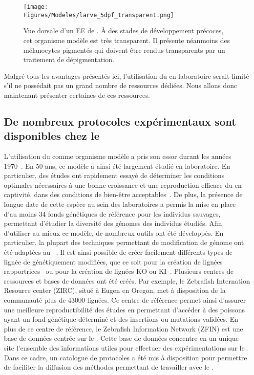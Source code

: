\documentclass[\main/main.tex]{subfiles}
\begin{document}
\begin{figure}[h!]
    \centering
    \texttt{[image: \\Figures/Modeles/larve\_5dpf\_transparent.png]}
    \caption{Vue dorsale d'un EE de \pz{}.\newline
    À des stades de développement précoces, cet organisme modèle est très transparent.
    Il présente néanmoins des mélanocytes pigmentés qui doivent être rendus transparents par un traitement de dépigmentation.
    }
    \label{fig:zebra:transparent}
\end{figure}


%
Malgré tous les avantages présentés ici, l'utilisation du \pz{} en laboratoire serait limité s'il ne possédait pas un grand nombre de ressources dédiées.
%
Nous allons donc maintenant présenter certaines de ces ressources.

    \subsection{De nombreux protocoles expérimentaux sont disponibles chez le \pz{}}
    
%
L'utilisation du \pz{} comme organisme modèle a pris son essor durant les années 1970~\cite{laale_1977}.
%
En 50 ans, ce modèle a ainsi été largement étudié en laboratoire.
%
En particulier, des études ont rapidement essayé de déterminer les conditions optimales nécessaires à une bonne croissance et une reproduction efficace du \pz{} en captivité, dans des conditions de bien-être acceptables~\cite{eaton_1974,eaton_1974a}.
%
De plus, la présence de longue date de cette espèce au sein des laboratoires a permis la mise en place d'au moins 34 fonds génétiques de référence pour les individus sauvages,
permettant d'étudier la diversité des génomes des individus étudiés.
%
Afin d'utiliser au mieux ce modèle, de nombreux outils ont été développés.
%
En particulier, la plupart des techniques permettant de modification de génome ont été adaptées au \pz{}~\cite{auer_2014,irion_2014,foley_2009,bill_2009}.
%
Il est ainsi possible de créer facilement différents types de lignée de \pz{} génétiquement modifiées, que ce soit pour la création de lignées rapportrices~\cite{brion_2012,goldman_2001} ou pour la création de lignées KO ou KI~\cite{liu_2019}.
%
Plusieurs centres de ressources et bases de données ont été créés.
%
Par exemple, le Zebrafish Internation Resource center (ZIRC), situé à Eugen en Oregon, met à disposition de la communauté plus de 43000 lignées.
%
Ce centre de référence permet ainsi d'assurer une meilleure reproductibilité des études
en permettant d'accéder à des poissons ayant un fond génétique déterminé et des insertions ou mutations validées.
%
En plus de ce centre de référence, le Zebrafish Information Network (ZFIN) est une base de données centrée sur le \pz{}.
%
Cette base de données concentre en un unique site l'ensemble des informations utiles pour effectuer des expérimentations sur le \pz{}.
%
Dans ce cadre, un catalogue de protocoles a été mis à disposition pour permettre de faciliter la diffusion des méthodes permettant de travailler avec le \pz{}.
\end{document}
